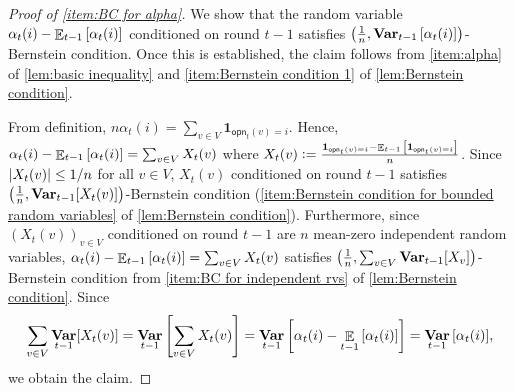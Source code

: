 \documentclass[letterpaper,11pt]{article}
\def\defeq{\mathrel{\mathop:}=}
\DeclarePairedDelimiter{\sbra}{\lbrack}{\rbrack} %
\newcommand{\indicator}{\mathbf{1}}
\DeclareMathOperator*{\E}{\mathbb{E}}
\DeclareMathOperator*{\Var}{\mathbf{Var}}
\newcommand{\alphanorm}{\gamma}
\newcommand{\opinion}{\mathsf{opn}}
\begin{document}
\begin{proof}[Proof of \cref{item:BC for alpha}]
    We show that the random variable $\alpha_{t}(i)-\E_{t-1}\qty[\alpha_{t}(i)]$ conditioned on round $t-1$ satisfies $\qty(\frac{1}{n},\Var_{t-1}\qty[\alpha_{t}(i)])$-Bernstein condition. 
    Once this is established, the claim follows from \cref{item:alpha} of \cref{lem:basic inequality} and \cref{item:Bernstein condition 1} of \cref{lem:Bernstein condition}.
    
      From definition, $n\alpha_{t}(i)=\sum_{v\in V}\indicator_{\opinion_t(v)=i}$.
      Hence, $\alpha_{t}(i)-\E_{t-1}\qty[\alpha_{t}(i)]=\sum_{v\in V}X_t(v)$ where $X_t(v)\defeq \frac{\indicator_{\opinion_t(v)=i}-\E_{t-1}\qty[\indicator_{\opinion_t(v)=i}]}{n}$.
      Since $\abs{X_t(v)}\leq 1/n$ for all $v\in V$, $X_t(v)$ conditioned on round $t-1$ satisfies $\qty(\frac{1}{n},\Var_{t-1}[X_t(v)])$-Bernstein condition (\cref{item:Bernstein condition for bounded random variables} of \cref{lem:Bernstein condition}).
      Furthermore, since $(X_t(v))_{v\in V}$ conditioned on round $t-1$ are $n$ mean-zero independent random variables, 
      $\alpha_{t}(i)-\E_{t-1}\qty[\alpha_{t}(i)]=\sum_{v\in V}X_t(v)$ satisfies $\qty(\frac{1}{n},\sum_{v\in V}\Var_{t-1}[X_v])$-Bernstein condition from \cref{item:BC for independent rvs} of \cref{lem:Bernstein condition}.
      Since 
      \[
      \sum_{v\in V}\Var_{t-1}[X_t(v)]=\Var_{t-1}\qty[\sum_{v\in V}X_t(v)]=\Var_{t-1}\qty[\alpha_{t}(i)-\E_{t-1}\qty[\alpha_{t}(i)]]=\Var_{t-1}\qty[\alpha_{t}(i)],
      \]
      we obtain the claim.
  \end{proof}
\end{document}
